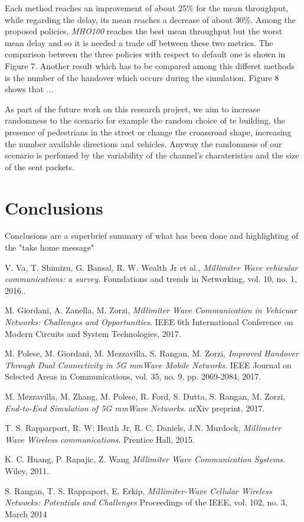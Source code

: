 \documentclass[conference,10pt]{IEEEtran}
\begin{document}
Each method reaches an improvement of about 25\% for the mean throughput, while regarding the delay, its mean reaches a decrease of about 30\%. Among the proposed policies, \textit{MHO100} reaches the best mean throughput but the worst mean delay and so it is needed a trade off between these two metrics.
The comparison between the three policies with respect to default one is shown in Figure 7.
Another result which has to be compared among this differet methods is the number of the handover which occurs during the simulation. Figure 8 shows that ...

As part of the future work on this research project, we aim to increase randomness to the scenario for example the random choice of te building, the presence of pedestrians in the street or change the croassroad shape, increasing the number  available directions and vehicles. Anyway the randomness of our scenario is perfomed by the variability of the channel's charateristics and the size of the sent packets.



\section{Conclusions}\label{sec:conclusion}
Conclusions are a superbrief summary of what has been done and highlighting of the "take home message"



\begin{thebibliography}{15}
	
	V. Va, T. Shimizu, G. Bansal, R. W. Wealth Jr et al.,
	\textit{Millimiter Wave vehicular communications: a survey}. 
	Foundations and trends in Networking, vol. 10, no. 1, 2016..
	
	M. Giordani, A. Zanella, M. Zorzi,
	\textit{Millimiter Wave Communication in Vehicuar Networks: Challenges and Opportunities}. 
	IEEE 6th International Conference on Modern Circuits and System Technologies, 2017.
	
	M. Polese, M. Giordani, M. Mezzavilla, S. Rangan, M. Zorzi,
	\textit{Improved Handover Through Dual Connectivity in 5G mmWave Mobile Networks}. 
	IEEE Journal on Selected Areas in Communications, vol. 35, no. 9, pp. 2069-2084, 2017.
	
	M. Mezzavilla, M. Zhang, M. Polese, R. Ford, S. Dutta, S. Rangan, M. Zorzi,
	\textit{End-to-End Simulation of 5G mmWave Networks}. 
	arXiv preprint, 2017.
	
	T. S. Rapparport, R. W: Heath Jr, R. C. Daniels, J.N. Murdock,
	\textit{Millimeter Wave Wireless communications}.
	Prentice Hall, 2015.
	
	K. C. Huang, P. Rapajic, Z. Wang
	\textit{Millimiter Wave Communication Systems}.
	Wiley, 2011.
	
	S. Rangan, T. S. Rappaport, E. Erkip,
	\textit{Millimiter-Wave Cellular Wireless Netwoeks: Potentials and Challenges}
	Proceedings of the IEEE, vol. 102, no. 3, March 2014
	
\end{thebibliography}
\end{document}
